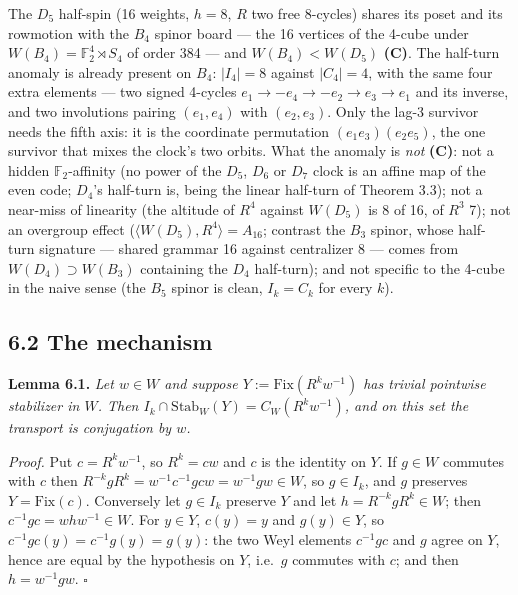 \documentclass[
]{article}
\begin{document}
The \(D_5\) half-spin (16 weights, \(h = 8\), \(R\) two free 8-cycles)
shares its poset and its rowmotion with the \(B_4\) spinor board --- the
16 vertices of the 4-cube under \(W(B_4) = \mathbb{F}_2^4 \rtimes S_4\)
of order 384 --- and \(W(B_4) < W(D_5)\) \textbf{(C)}. The half-turn
anomaly is already present on \(B_4\): \(|I_4| = 8\) against
\(|C_4| = 4\), with the same four extra elements --- two signed 4-cycles
\(e_1 \to -e_4 \to -e_2 \to e_3 \to e_1\) and its inverse, and two
involutions pairing \((e_1, e_4)\) with \((e_2, e_3)\). Only the lag-3
survivor needs the fifth axis: it is the coordinate permutation
\((e_1e_3)(e_2e_5)\), the one survivor that mixes the clock's two
orbits. What the anomaly is \emph{not} \textbf{(C)}: not a hidden
\(\mathbb{F}_2\)-affinity (no power of the \(D_5\), \(D_6\) or \(D_7\)
clock is an affine map of the even code; \(D_4\)'s half-turn is, being
the linear half-turn of Theorem 3.3); not a near-miss of linearity (the
altitude of \(R^4\) against \(W(D_5)\) is 8 of 16, of \(R^3\) 7); not an
overgroup effect (\(\langle W(D_5), R^4 \rangle = A_{16}\); contrast the
\(B_3\) spinor, whose half-turn signature --- shared grammar 16 against
centralizer 8 --- comes from \(W(D_4) \supset W(B_3)\) containing the
\(D_4\) half-turn); and not specific to the 4-cube in the naive sense
(the \(B_5\) spinor is clean, \(I_k = C_k\) for every \(k\)).

\subsection{6.2 The mechanism}\label{the-mechanism}

\textbf{Lemma 6.1.} \emph{Let \(w \in W\) and suppose
\(Y := \mathrm{Fix}(R^kw^{-1})\) has trivial pointwise stabilizer in
\(W\). Then \(I_k \cap \mathrm{Stab}_W(Y) = C_W(R^kw^{-1})\), and on
this set the transport is conjugation by \(w\).}

\emph{Proof.} Put \(c = R^kw^{-1}\), so \(R^k = cw\) and \(c\) is the
identity on \(Y\). If \(g \in W\) commutes with \(c\) then
\(R^{-k}gR^k = w^{-1}c^{-1}gcw = w^{-1}gw \in W\), so \(g \in I_k\), and
\(g\) preserves \(Y = \mathrm{Fix}(c)\). Conversely let \(g \in I_k\)
preserve \(Y\) and let \(h = R^{-k}gR^k \in W\); then
\(c^{-1}gc = whw^{-1} \in W\). For \(y \in Y\), \(c(y) = y\) and
\(g(y) \in Y\), so \(c^{-1}gc(y) = c^{-1}g(y) = g(y)\): the two Weyl
elements \(c^{-1}gc\) and \(g\) agree on \(Y\), hence are equal by the
hypothesis on \(Y\), i.e.~\(g\) commutes with \(c\); and then
\(h = w^{-1}gw\). \(\square\)
\end{document}
